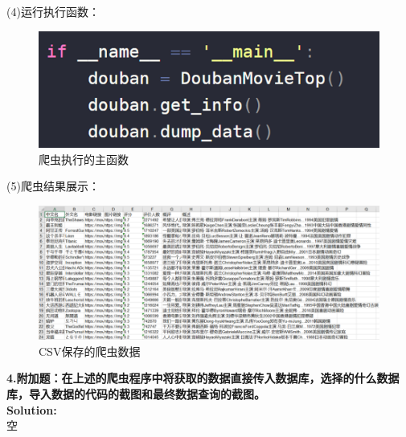 \documentclass{article}
\begin{document}
\begin{homeworkProblem}
{(4)运行执行函数： 
	\begin{figure}[H]  %
	\centering
	\includegraphics[width=0.7\linewidth]{images/Fig5}
	\caption{爬虫执行的主函数}
	\label{fig:ucas-logo}
\end{figure}


(5)爬虫结果展示：
	\begin{figure}[H]  %
	\centering
	\includegraphics[width=1\linewidth]{images/Fig6}
	\caption{CSV保存的爬虫数据}
	\label{fig:ucas-logo}
\end{figure}
}


\end{homeworkProblem}
\pagebreak

\begin{homeworkProblem}
\textbf{4.附加题：在上述的爬虫程序中将获取的数据直接传入数据库，选择的什么数据库，导入数据的代码的截图和最终数据查询的截图。}\\
\textbf{Solution:}\\
{\color{blue}
空
}
\end{homeworkProblem}



\end{document}
